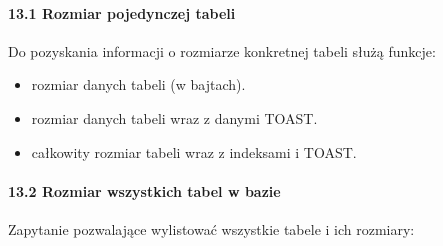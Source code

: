 \documentclass[letterpaper,10pt,polish]{sphinxmanual}
\begin{document}
\paragraph{13.1 Rozmiar pojedynczej tabeli}
\label{\detokenize{rozdzial2/Konfiguracja_baz_danych/Konfiguracja_baz_danych:rozmiar-pojedynczej-tabeli}}
\sphinxAtStartPar
Do pozyskania informacji o rozmiarze konkretnej tabeli służą funkcje:
\begin{itemize}
\item {} 
\sphinxAtStartPar
{} \textendash{} rozmiar danych tabeli (w bajtach).

\item {} 
\sphinxAtStartPar
{} \textendash{} rozmiar danych tabeli wraz z danymi TOAST.

\item {} 
\sphinxAtStartPar
{} \textendash{} całkowity rozmiar tabeli wraz z indeksami i TOAST.

\end{itemize}

\sphinxAtStartPar
{}

\begin{sphinxVerbatim}[commandchars=\\\{\}]
    
    
    
\end{sphinxVerbatim}


\paragraph{13.2 Rozmiar wszystkich tabel w bazie}
\label{\detokenize{rozdzial2/Konfiguracja_baz_danych/Konfiguracja_baz_danych:rozmiar-wszystkich-tabel-w-bazie}}
\sphinxAtStartPar
Zapytanie pozwalające wylistować wszystkie tabele i ich rozmiary:
\end{document}
